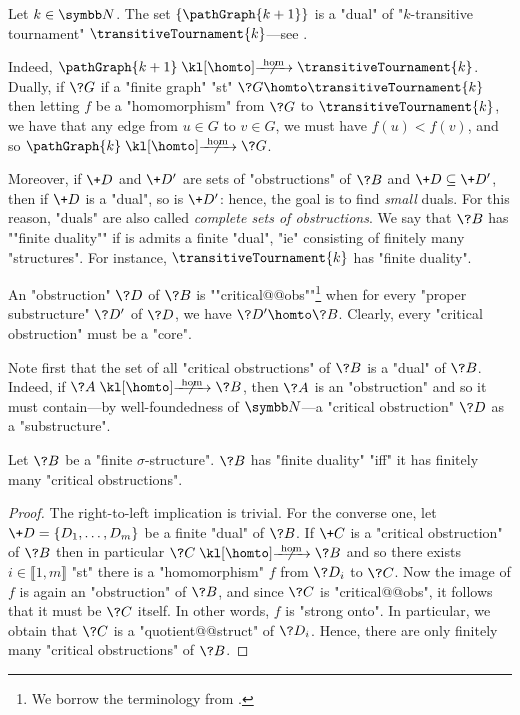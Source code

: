 \begin{example}
	\AP\label{ex:dual-T2} Let $k\in\N$. The set
	$\{\pathGraph{k+1}\}$ is a "dual" of 
	"$k$-transitive tournament" $\transitiveTournament{k}$---see .
	
	Indeed, $\pathGraph{k+1} \nothomto \transitiveTournament{k}$. Dually,
	if $\?G$ if a "finite graph" "st" $\?G \homto \transitiveTournament{k}$ then
	letting $f$ be a "homomorphism" from $\?G$ to $\transitiveTournament{k}$,
	we have that any edge from $u \in G$ to $v \in G$, we must have $f(u) < f(v)$,
	and so $\pathGraph{k} \nothomto \?G$.
\end{example}

Moreover, if $\+D$ and $\+D'$ are sets of "obstructions" of $\?B$ and $\+D \subseteq \+D'$,
then if $\+D$ is a "dual", so is $\+D'$: hence, the goal is to find \emph{small} duals.
For this reason, "duals" are also called \emph{complete sets of obstructions}.
We say that $\?B$ has \AP""finite duality"" if is admits a finite "dual", "ie"
consisting of finitely many "structures". For instance, $\transitiveTournament{k}$ has "finite duality".

An "obstruction" $\?D$ of $\?B$ is \AP""critical@@obs""\footnote{We borrow the terminology
from \cite{LaroseLotenTardif2007CharacterisationFOCSP}.} when for every
"proper substructure" $\?D'$ of $\?D$, we have $\?D' \homto \?B$.
Clearly, every "critical obstruction" must be a "core".

Note first that the set of all "critical obstructions" of $\?B$ is a "dual" of $\?B$.
Indeed, if $\?A \nothomto \?B$, then $\?A$ is an "obstruction" and so it must contain---by well-foundedness of $\N$---a "critical obstruction" $\?D$ as a "substructure".

\begin{proposition}
	\label{prop:finite-duality-iff-critical-obstructions}
	Let $\?B$ be a "finite $\sigma$-structure". $\?B$ has "finite duality"
	"iff" it has finitely many "critical obstructions".
\end{proposition}

\begin{proof}
	The right-to-left implication is trivial. For the converse one,
	let $\+D = \{D_1,\hdots,D_m\}$ be a finite "dual" of $\?B$.
	If $\+C$ is a "critical obstruction" of $\?B$ then in particular $\?C \nothomto \?B$
	and so there exists $i \in \lBrack 1,m\rBrack$ "st" there is a "homomorphism" $f$ 
	from $\?D_i$ to $\?C$. Now the image of $f$ is again an "obstruction" of $\?B$,
	and since $\?C$ is "critical@@obs", it follows that it must be $\?C$ itself. In other
	words, $f$ is "strong onto". In particular, we obtain that $\?C$ is a "quotient@@struct" of
	$\?D_i$. Hence, there are only finitely many "critical obstructions" of $\?B$.
\end{proof}

